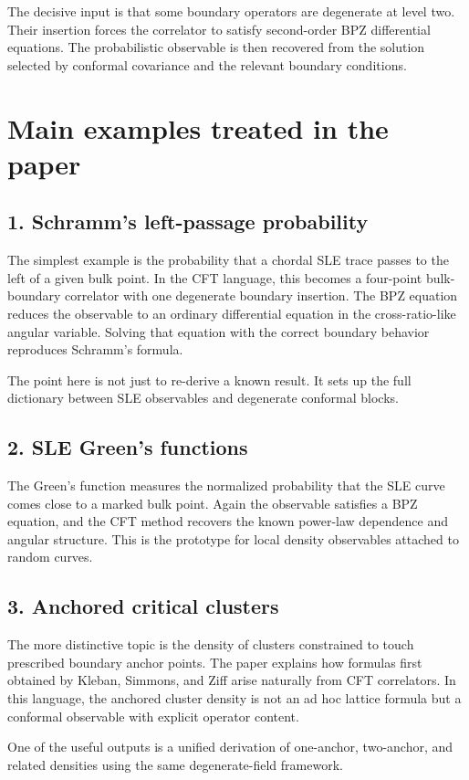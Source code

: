 \documentclass[11pt]{article}
\begin{document}
The decisive input is that some boundary operators are degenerate at level two. Their insertion forces the correlator to satisfy second-order BPZ differential equations. The probabilistic observable is then recovered from the solution selected by conformal covariance and the relevant boundary conditions.
\section*{Main examples treated in the paper}
\subsection*{1. Schramm's left-passage probability}
The simplest example is the probability that a chordal SLE trace passes to the left of a given bulk point. In the CFT language, this becomes a four-point bulk-boundary correlator with one degenerate boundary insertion. The BPZ equation reduces the observable to an ordinary differential equation in the cross-ratio-like angular variable. Solving that equation with the correct boundary behavior reproduces Schramm's formula.

The point here is not just to re-derive a known result. It sets up the full dictionary between SLE observables and degenerate conformal blocks.
\subsection*{2. SLE Green's functions}
The Green's function measures the normalized probability that the SLE curve comes close to a marked bulk point. Again the observable satisfies a BPZ equation, and the CFT method recovers the known power-law dependence and angular structure. This is the prototype for local density observables attached to random curves.
\subsection*{3. Anchored critical clusters}
The more distinctive topic is the density of clusters constrained to touch prescribed boundary anchor points. The paper explains how formulas first obtained by Kleban, Simmons, and Ziff arise naturally from CFT correlators. In this language, the anchored cluster density is not an ad hoc lattice formula but a conformal observable with explicit operator content.

One of the useful outputs is a unified derivation of one-anchor, two-anchor, and related densities using the same degenerate-field framework.
\end{document}

